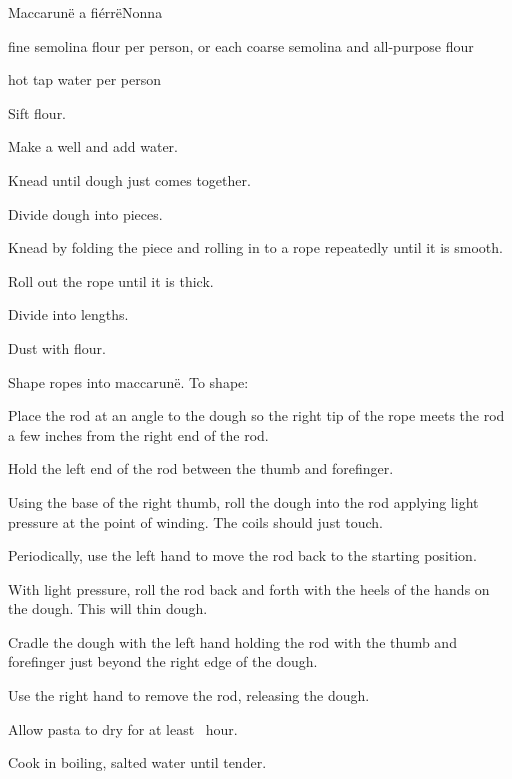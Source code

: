 \begin{recipe}{Maccarunë a fiérrë}{Nonna}{}

\begin{ingredients}
\item {} fine semolina flour per person, or  each coarse semolina and all-purpose flour
\item {} hot tap water per person
\end{ingredients}

\begin{directions}
\item Sift flour.
\item Make a well and add water.
\item Knead until dough just comes together.
\item Divide dough into pieces.
\item Knead by folding the piece and rolling in to a rope repeatedly until it is smooth.
\item Roll out the rope until it is \inch{\quarter} thick.
\item Divide into  lengths.
\item Dust with flour.
\item Shape ropes into maccarunë. To shape:\par
\begin{enumerate*}
\item Place the rod at an angle to the dough so the right tip of the rope meets the rod a few inches from the right end of the rod.
\item Hold the left end of the rod between the thumb and forefinger.
\item Using the base of the right thumb, roll the dough into the rod applying light pressure at the point of winding. The coils should just touch.
\item Periodically, use the left hand to move the rod back to the starting position.
\item With light pressure, roll the rod back and forth with the heels of the hands on the dough. This will thin dough.
\item Cradle the dough with the left hand holding the rod with the thumb and forefinger just beyond the right edge of the dough.
\item Use the right hand to remove the rod, releasing the dough.
\end{enumerate*}
\item Allow pasta to dry for at least \half{}~hour.
\item Cook in boiling, salted water until tender.
\end{directions}

\end{recipe}
